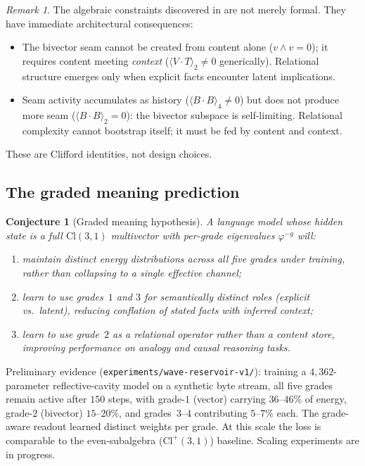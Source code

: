 \documentclass[11pt,a4paper]{article}
\theoremstyle{plain}
\newtheorem{conjecture}[theorem]{Conjecture}
\theoremstyle{definition}
\theoremstyle{remark}
\newtheorem{remark}[theorem]{Remark}
\numberwithin{equation}{section}
\providecommand{\Cl}{\mathrm{Cl}}
\providecommand{\vp}{\varphi}
\begin{document}
\begin{remark}
The algebraic constraints discovered in 
are not merely formal.  They have immediate architectural
consequences:
\begin{itemize}
  \item The bivector seam cannot be created from content alone
    ($v \wedge v = 0$); it requires content meeting \emph{context}
    ($\langle V \cdot T \rangle_2 \ne 0$ generically).
    Relational structure emerges only when explicit facts encounter
    latent implications.
  \item Seam activity accumulates as history
    ($\langle B \cdot B \rangle_4 \ne 0$) but does not produce
    more seam ($\langle B \cdot B \rangle_2 = 0$): the bivector
    subspace is self-limiting.  Relational complexity cannot
    bootstrap itself; it must be fed by content and context.
\end{itemize}
These are Clifford identities, not design choices.
\end{remark}


\subsection{The graded meaning prediction}

\begin{conjecture}[Graded meaning hypothesis]
\label{conj:graded-meaning}
A language model whose hidden state is a full $\Cl(3,1)$ multivector
with per-grade eigenvalues $\vp^{-g}$ will:
\begin{enumerate}[label=\textnormal{(\arabic*)}]
  \item maintain distinct energy distributions across all five
    grades under training, rather than collapsing to a
    single effective channel;
  \item learn to use grades~$1$ and $3$ for semantically distinct
    roles (explicit vs.\ latent), reducing conflation of stated
    facts with inferred context;
  \item learn to use grade~$2$ as a relational operator rather
    than a content store, improving performance on analogy and
    causal reasoning tasks.
\end{enumerate}
\end{conjecture}

Preliminary evidence (\texttt{experiments/wave-reservoir-v1/}):
training a $4{,}362$-parameter reflective-cavity model on a
synthetic byte stream, all five grades remain active after $150$
steps, with grade-$1$ (vector) carrying $36$--$46\%$ of energy,
grade-$2$ (bivector) $15$--$20\%$, and grades~$3$--$4$ contributing
$5$--$7\%$ each.  The grade-aware readout learned distinct weights
per grade.  At this scale the loss is comparable to the
even-subalgebra ($\Cl^+(3,1)$) baseline.  Scaling experiments are
in progress.
\end{document}
